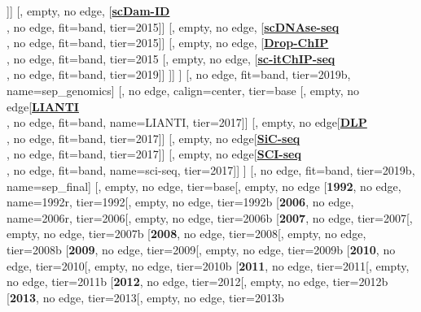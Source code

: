 \documentclass[12pt, a4]{article}
\begin{document}
\begin{center}
\begin{forest}
		[\href{https://doi.org/10.1038/nature21429}{\textbf{scHi-C}}\\\citealt{stevens2017}, edge=dotted, fit=band, tier=2017]
	]]
	[, empty, no edge, [\href{https://www.sciencedirect.com/science/article/pii/S0092867415010922}{\textbf{scDam-ID}}\\\citealt{kind2015}, no edge, fit=band, tier=2015]]
	[, empty, no edge, [\href{https://www.nature.com/articles/nature15740}{\textbf{scDNAse-seq}}\\\citealt{jin2015}, no edge, fit=band, tier=2015]]
	[, empty, no edge, [\href{https://www.nature.com/articles/nbt.3383}{\textbf{Drop-ChIP}}\\\citealt{rotem2015}, no edge, fit=band, tier=2015
		[, empty, no edge, [\href{https://www.nature.com/articles/s41556-019-0383-5}{\textbf{sc-itChIP-seq}}\\\citealt{ai2019}, no edge, fit=band, tier=2019]]
	]]
]
[, no edge, fit=band, tier=2019b, name=sep_genomics]
[, no edge, calign=center, tier=base
	[, empty, no edge[\href{https://science.sciencemag.org/content/356/6334/189}{\textbf{LIANTI}}\\\citealt{chen2017}, no edge, fit=band, name=LIANTI, tier=2017]]
	[, empty, no edge[\href{https://www.nature.com/articles/nmeth.4140}{\textbf{DLP}}\\\citealt{zahn2017}, no edge, fit=band, tier=2017]]
	[, empty, no edge[\href{https://www.nature.com/articles/nbt.3880}{\textbf{SiC-seq}}\\\citealt{lan2017}, no edge, fit=band, tier=2017]]
	[, empty, no edge[\href{https://www.nature.com/articles/nmeth.4154}{\textbf{SCI-seq}}\\\citealt{vitak2017}, no edge, fit=band, name=sci-seq, tier=2017]]
]
[, no edge, fit=band, tier=2019b, name=sep_final]
[, empty, no edge, tier=base[, empty, no edge
	[\textbf{\large{1992}}, no edge, name=1992r, tier=1992[, empty, no edge, tier=1992b
	[\textbf{\large{2006}}, no edge, name=2006r, tier=2006[, empty, no edge, tier=2006b
	[\textbf{\large{2007}}, no edge, tier=2007[, empty, no edge, tier=2007b
	[\textbf{\large{2008}}, no edge, tier=2008[, empty, no edge, tier=2008b
	[\textbf{\large{2009}}, no edge, tier=2009[, empty, no edge, tier=2009b
	[\textbf{\large{2010}}, no edge, tier=2010[, empty, no edge, tier=2010b
	[\textbf{\large{2011}}, no edge, tier=2011[, empty, no edge, tier=2011b
	[\textbf{\large{2012}}, no edge, tier=2012[, empty, no edge, tier=2012b
	[\textbf{\large{2013}}, no edge, tier=2013[, empty, no edge, tier=2013b

\end{forest}
\end{center}
\end{document}
